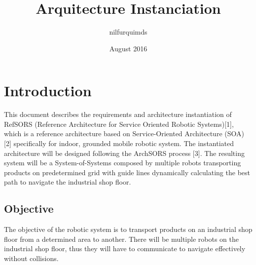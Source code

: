 \documentclass{report}
\title{Arquitecture Instanciation}
\author{nilfurquimds}
\date{August 2016}
\begin{document}
\maketitle

\section*{Introduction}
This document describes the requirements and architecture instantiation of RefSORS (Reference Architecture for Service Oriented Robotic Systems)[1], which is a reference architecture based on Service-Oriented Architecture (SOA) [2] specifically for indoor, grounded mobile robotic system. The instantiated architecture will be designed following the ArchSORS process [3]. The resulting system will be a System-of-Systems composed by multiple robots transporting products on predetermined grid with guide lines dynamically calculating the best path to navigate the industrial shop floor.

\subsection*{Objective}
The objective of the robotic system is to transport products on an industrial shop floor from a determined area to another. There will be multiple robots on the industrial shop floor, thus they will have to communicate to navigate effectively without collisions.










\end{document}
